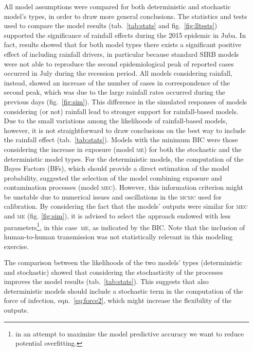 All model assumptions were compared for both deterministic and stochastic model's types, in order to draw more general conclusions. The statistics and tests used to compare the model results  (tab.~\ref{tab:stats} and fig.~\ref{fig:lltests}) supported the significance of rainfall effects during the 2015 epidemic in Juba. In fact, results showed that for both model types there exists a significant positive effect of including rainfall drivers, in particular because standard SIRB models were not able to reproduce the second epidemiological peak of reported cases occurred in July during the recession period. All models considering rainfall, instead, showed an increase of the number of cases in correspondence of the second peak, which was due to the large rainfall rates occurred during the previous days (fig.~\ref{fig:sim}). 
This difference in the simulated responses of models considering (or not) rainfall lead to stronger support for rainfall-based models. Due to the small variations among the likelihoods of rainfall-based models, however, it is not straightforward to draw conclusions on the best way to include the rainfall effect (tab.~\ref{tab:stats}).
Models with the minimum BIC were those considering the increase in exposure (model \textsc{me}) for both the stochastic and the deterministic model types. For the deterministic models, the computation of the Bayes Factors (BFs), which should provide a direct estimation of the model probability, suggested the selection of the model combining exposure and contamination processes (model \textsc{mec}). However, this information criterion might be unstable due to numerical issues and oscillations in the \textsc{mcmc} used for calibration\cite{Raftery:EstimatingIntegratedLikelihood:2007}. By considering the fact that the models' outputs were similar for \textsc{mec} and \textsc{me} (fig. \ref{fig:sim}), it is advised to select the approach endowed with less parameters\footnote{in an attempt to maximize the model predictive accuracy we want to reduce potential overfitting.}, in this case~\textsc{me}, as indicated by the BIC. Note that the inclusion of human-to-human transmission was not statistically relevant in this modeling exercise.

The comparison between the likelihoods of the two models' types (deterministic and stochastic) showed that considering the stochasticity of the processes improves the model results (tab.~\ref{tab:stats}). This suggests that also deterministic models should include a stochastic term in the computation of the force of infection, eqn.~\eqref{eq:force2}, which might increase the flexibility of the outputs.

